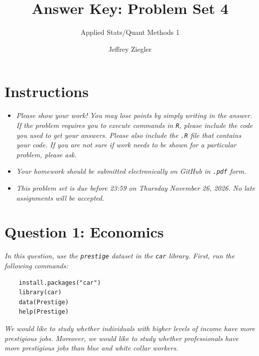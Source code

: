\documentclass[12pt,letterpaper]{article}
\title{Answer Key: Problem Set 4}
\date{Jeffrey Ziegler}
\author{Applied Stats/Quant Methods 1}
\begin{document}
	\maketitle
	
	\section*{Instructions}
	\begin{itemize}
		\item \textit{Please show your work! You may lose points by simply writing in the answer. If the problem requires you to execute commands in \texttt{R}, please include the code you used to get your answers. Please also include the \texttt{.R} file that contains your code. If you are not sure if work needs to be shown for a particular problem, please ask.}
	\item \textit{Your homework should be submitted electronically on GitHub in \texttt{.pdf} form.}
	\item \textit{This problem set is due before 23:59 on Thursday November 26, 2026. No late assignments will be accepted.}
	\end{itemize}
		\vspace{.5cm}
	\section*{Question 1: Economics}
	\vspace{.25cm}
	\noindent 	\textit{In this question, use the \texttt{prestige} dataset in the \texttt{car} library. First, run the following commands:}
	
	\begin{verbatim}
	install.packages("car")
	library(car)
	data(Prestige)
	help(Prestige)
	\end{verbatim} 
	
	
	\noindent \textit{We would like to study whether individuals with higher levels of income have more prestigious jobs. Moreover, we would like to study whether professionals have more prestigious jobs than blue and white collar workers.}
	
\end{document}
